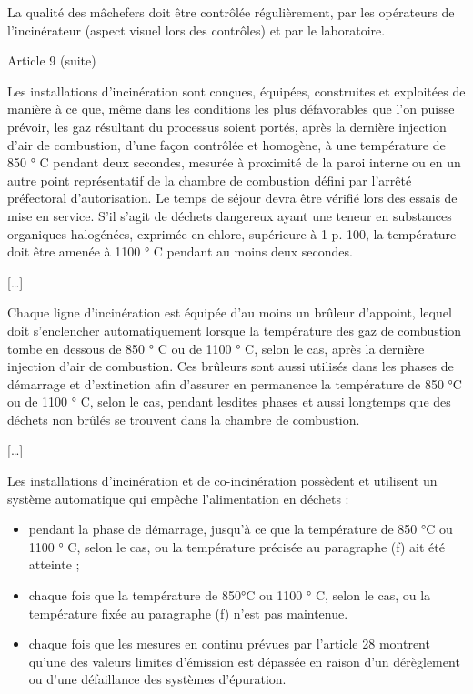 La qualité des mâchefers doit être contrôlée régulièrement, par les opérateurs de l'incinérateur (aspect visuel lors des contrôles) et par le laboratoire.

\vspace{0.3cm}
Article 9 (suite)
\vspace{0.3cm} 

\begin{tcolorbox}[colback=blue!5!white,colframe=blue!75!black]

Les installations d’incinération sont conçues, équipées, construites et exploitées de manière à ce que, même dans les conditions les plus défavorables que l’on puisse prévoir, les gaz résultant du processus soient portés, après la dernière injection d’air de combustion, d’une façon contrôlée et homogène, à une température de 850 ° C pendant deux secondes, mesurée à proximité de la paroi interne ou en un autre point représentatif de la chambre de combustion défini par l’arrêté préfectoral d’autorisation. Le temps de séjour devra être vérifié lors des essais de mise en service. S’il s’agit de déchets dangereux ayant une teneur en substances organiques halogénées, exprimée en chlore, supérieure à 1 p. 100, la température doit être amenée à 1100 ° C pendant au moins deux secondes.
\end{tcolorbox}

[…]
\begin{tcolorbox}[colback=blue!5!white,colframe=blue!75!black]
Chaque ligne d’incinération est équipée d’au moins un brûleur d’appoint, lequel doit s’enclencher automatiquement lorsque la température des gaz de combustion tombe en dessous de 850 ° C ou de 1100 ° C, selon le cas, après la dernière injection d’air de combustion. Ces brûleurs sont aussi utilisés dans les phases de démarrage et d’extinction afin d’assurer en permanence la température de 850 °C ou de 1100 ° C, selon le cas, pendant lesdites phases et aussi longtemps que des déchets non brûlés se trouvent dans la chambre de combustion.
\end{tcolorbox}

[…]
\vspace{0.3cm} 

\begin{tcolorbox}[colback=blue!5!white,colframe=blue!75!black]
Les installations d’incinération et de co-incinération possèdent et utilisent un système automatique qui empêche l’alimentation en déchets :
\begin{itemize}
\item pendant la phase de démarrage, jusqu'à ce que la température de 850 °C ou 1100 ° C, selon le cas, ou la température précisée au paragraphe (f) ait été atteinte ;
\item chaque fois que la température de 850°C ou 1100 ° C, selon le cas, ou la température fixée au paragraphe (f) n’est pas maintenue.
\item  chaque fois que les mesures en continu prévues par l’article 28 montrent qu’une des valeurs limites d’émission est dépassée en raison d’un dérèglement ou d’une défaillance des systèmes d’épuration.
\end{itemize}
\end{tcolorbox}

